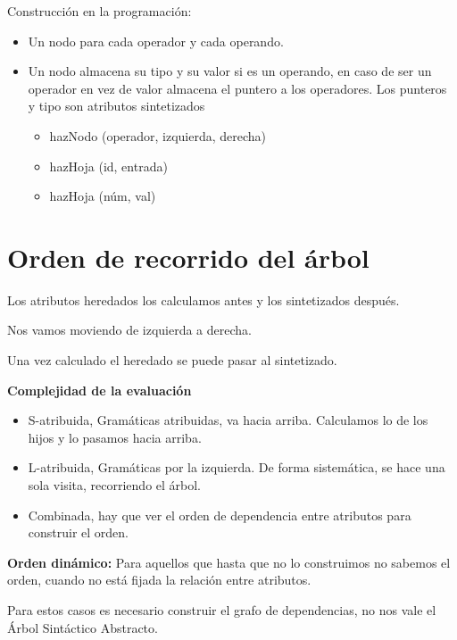 \documentclass[12pt, twoside, openright]{report} %
\begin{document}
Construcción en la programación:
\begin{itemize}
	\item Un nodo para cada operador y cada operando.
	\item Un nodo almacena su tipo y su valor si es un operando, en caso de ser un operador en vez de valor almacena el puntero a los operadores. Los punteros y tipo son atributos sintetizados
	      \begin{itemize}
		      \item hazNodo (operador, izquierda, derecha)
		      \item hazHoja (id, entrada)
		      \item hazHoja (núm, val)
	      \end{itemize}
\end{itemize}

\section{Orden de recorrido del árbol}

Los atributos heredados los calculamos antes y los sintetizados después.

Nos vamos moviendo de izquierda a derecha.

Una vez calculado el heredado se puede pasar al sintetizado.

\textbf{Complejidad de la evaluación}
\begin{figure}[H]
	{\def\svgwidth{.7\textwidth}
		}
\end{figure}
\begin{itemize}
	\item S-atribuida, Gramáticas atribuidas, va hacia arriba. Calculamos lo de los hijos y lo pasamos hacia arriba.
	\item L-atribuida, Gramáticas por la izquierda. De forma sistemática, se hace una sola visita, recorriendo el árbol.
	\item Combinada, hay que ver el orden de dependencia entre atributos para construir el orden.
\end{itemize}

\textbf{Orden dinámico:} Para aquellos que hasta que no lo construimos no sabemos el orden, cuando no está fijada la relación entre atributos.

Para estos casos es necesario construir el grafo de dependencias, no nos vale el Árbol Sintáctico Abstracto.
\end{document}
